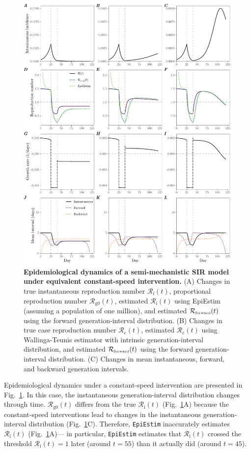 \documentclass[12pt]{article}
\newcommand{\fref}[1]{Fig.~\ref{fig:#1}}
\newcommand{\Rx}[1]{\ensuremath{{\mathcal R}_{#1}}\xspace}
\newcommand{\Rc}{\Rx{\mathrm{c}}}
\newcommand{\Ri}{\Rx{\mathrm{i}}}
\newcommand{\RR}{\ensuremath{{\mathcal R}}\xspace}
\newcommand{\Rcori}{\Rx{\mathrm{g0}}}
\newcommand{\tsub}[2]{#1_{{\textrm{\tiny #2}}}}
\begin{document}
\begin{figure}
\includegraphics[width=\textwidth]{figure_sir_semi.pdf}
\caption{
\textbf{Epidemiological dynamics of a semi-mechanistic SIR model under equivalent constant-speed intervention.}
(A) Changes in true instantaneous reproduction number $\Ri(t)$, proportional reproduction number $\Rcori(t)$, estimated $\Ri(t)$ using EpiEstim (assuming a population of one million), and estimated $\tsub{\RR}{forward}(t)$ using the forward generation-interval distribution.
(B) Changes in true case reproduction number $\Rc(t)$, estimated $\Rc(t)$ using Wallinga-Teunis estimator with intrinsic generation-interval distribution, and estimated $\tsub{\RR}{forward}(t)$ using the forward generation-interval distribution.
(C) Changes in mean instantaneous, forward, and backward generation intervals.
}
\label{fig:sir_semi}
\end{figure}

Epidemiological dynamics under a constant-speed intervention are presented in \fref{sir_semi}.
In this case, the instantaneous generation-interval distribution changes through time.  
$\Rcori(t)$ differs from the true $\Ri(t)$ (\fref{sir_semi}A) because the constant-speed interventions lead to changes in the instantaneous generation-interval distribution (\fref{sir_semi}C).
Therefore, \texttt{EpiEstim} inaccurately estimates $\Ri(t)$ (\fref{sir_semi}A)---
in particular, \texttt{EpiEstim} estimates that $\Ri(t)$ crossed the threshold $\Ri(t)=1$ later (around $t=55$) than it actually did (around $t=45$).
\end{document}
